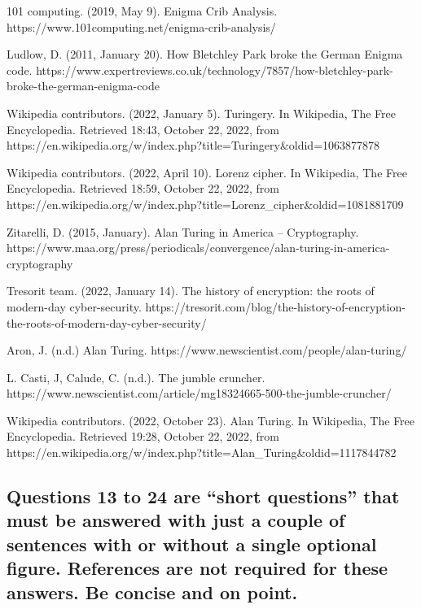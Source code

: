 \documentclass[11pt]{article}
\begin{document}
101 computing. (2019, May 9). Enigma Crib Analysis.
https://www.101computing.net/enigma-crib-analysis/

Ludlow, D. (2011, January 20). How Bletchley Park broke the German
Enigma code.
https://www.expertreviews.co.uk/technology/7857/how-bletchley-park-broke-the-german-enigma-code

Wikipedia contributors. (2022, January 5). Turingery. In Wikipedia, The
Free Encyclopedia. Retrieved 18:43, October 22, 2022, from
https://en.wikipedia.org/w/index.php?title=Turingery\&oldid=1063877878

Wikipedia contributors. (2022, April 10). Lorenz cipher. In Wikipedia,
The Free Encyclopedia. Retrieved 18:59, October 22, 2022, from
https://en.wikipedia.org/w/index.php?title=Lorenz\_cipher\&oldid=1081881709

Zitarelli, D. (2015, January). Alan Turing in America -- Cryptography.
https://www.maa.org/press/periodicals/convergence/alan-turing-in-america-cryptography

Tresorit team. (2022, January 14). The history of encryption: the roots
of modern-day cyber-security.
https://tresorit.com/blog/the-history-of-encryption-the-roots-of-modern-day-cyber-security/

Aron, J. (n.d.) Alan Turing.
https://www.newscientist.com/people/alan-turing/

L. Casti, J, Calude, C. (n.d.). The jumble cruncher.
https://www.newscientist.com/article/mg18324665-500-the-jumble-cruncher/

Wikipedia contributors. (2022, October 23). Alan Turing. In Wikipedia,
The Free Encyclopedia. Retrieved 19:28, October 22, 2022, from
https://en.wikipedia.org/w/index.php?title=Alan\_Turing\&oldid=1117844782

    \hypertarget{questions-13-to-24-are-short-questions-that-must-be-answered-with-just-a-couple-of-sentences-with-or-without-a-single-optional-figure.-references-are-not-required-for-these-answers.-be-concise-and-on-point.}{%
\subsection{Questions 13 to 24 are ``short questions'' that must be
answered with just a couple of sentences with or without a single
optional figure. References are not required for these answers. Be
concise and on
point.}\label{questions-13-to-24-are-short-questions-that-must-be-answered-with-just-a-couple-of-sentences-with-or-without-a-single-optional-figure.-references-are-not-required-for-these-answers.-be-concise-and-on-point.}}
\end{document}
